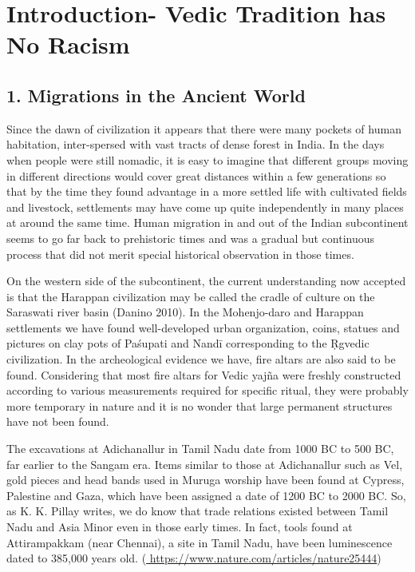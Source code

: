 
\chapter*{Introduction- Vedic Tradition has No Racism}\label{intro}



\section*{1. Migrations in the Ancient World}

Since the dawn of civilization it appears that there were many pockets of human habitation, inter-spersed with vast tracts of dense forest in India. In the days when people were still nomadic, it is easy to imagine that different groups moving in different directions would cover great distances within a few generations so that by the time they found advantage in a more settled life with cultivated fields and livestock, settlements may have come up quite independently in many places at around the same time. Human migration in and out of the Indian subcontinent seems to go far back to prehistoric times and was a gradual but continuous process that did not merit special historical observation in those times.

On the western side of the subcontinent, the current understanding now accepted is that the Harappan civilization may be called the cradle of culture on the Saraswati river basin (Danino 2010). In the Mohenjo-daro and Harappan settlements we have found well-developed urban organization, coins, statues and pictures on clay pots of Paśupati and Nandī corresponding to the Ṛgvedic civilization. In the archeological evidence we have, fire altars are also said to be found. Considering that most fire altars for Vedic yajña were freshly constructed according to various measurements required for specific ritual, they were probably more temporary in nature and it is no wonder that large permanent structures have not been found.

The excavations at Adichanallur in Tamil Nadu date from 1000 BC to 500 BC, far earlier to the Sangam era. Items similar to those at Adichanallur such as Vel, gold pieces and head bands used in Muruga worship have been found at Cypress, Palestine and Gaza, which have been assigned a date of 1200 BC to 2000 BC. So, as K. K. Pillay writes, we do know that trade relations existed between Tamil Nadu and Asia Minor even in those early times. In fact, tools found at Attirampakkam (near Chennai), a site in Tamil Nadu, have been luminescence dated to 385,000 years old. (\url{ https://www.nature.com/articles/nature25444})

